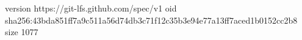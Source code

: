 version https://git-lfs.github.com/spec/v1
oid sha256:43bda851ff7a9c511a56d74db3c71f12c35b3e94e77a13ff7aced1b0152cc2b8
size 1077
